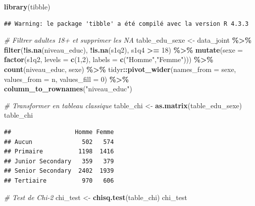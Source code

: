 \documentclass[
]{article}
\newenvironment{Shaded}{\begin{snugshade}}{\end{snugshade}}
\newcommand{\AttributeTok}[1]{\textcolor[rgb]{0.13,0.29,0.53}{#1}}
\newcommand{\CommentTok}[1]{\textcolor[rgb]{0.56,0.35,0.01}{\textit{#1}}}
\newcommand{\DecValTok}[1]{\textcolor[rgb]{0.00,0.00,0.81}{#1}}
\newcommand{\FunctionTok}[1]{\textcolor[rgb]{0.13,0.29,0.53}{\textbf{#1}}}
\newcommand{\NormalTok}[1]{#1}
\newcommand{\OtherTok}[1]{\textcolor[rgb]{0.56,0.35,0.01}{#1}}
\newcommand{\SpecialCharTok}[1]{\textcolor[rgb]{0.81,0.36,0.00}{\textbf{#1}}}
\newcommand{\StringTok}[1]{\textcolor[rgb]{0.31,0.60,0.02}{#1}}
\begin{document}
\begin{Shaded}
\begin{Highlighting}[]
\FunctionTok{library}\NormalTok{(tibble)}
\end{Highlighting}
\end{Shaded}

\begin{verbatim}
## Warning: le package 'tibble' a été compilé avec la version R 4.3.3
\end{verbatim}

\begin{Shaded}
\begin{Highlighting}[]
\CommentTok{\# Filtrer adultes 18+ et supprimer les NA}
\NormalTok{table\_edu\_sexe }\OtherTok{\textless{}{-}}\NormalTok{ data\_joint }\SpecialCharTok{\%\textgreater{}\%}
  \FunctionTok{filter}\NormalTok{(}\SpecialCharTok{!}\FunctionTok{is.na}\NormalTok{(niveau\_educ), }\SpecialCharTok{!}\FunctionTok{is.na}\NormalTok{(s1q2), s1q4 }\SpecialCharTok{\textgreater{}=} \DecValTok{18}\NormalTok{) }\SpecialCharTok{\%\textgreater{}\%}
  \FunctionTok{mutate}\NormalTok{(}\AttributeTok{sexe =} \FunctionTok{factor}\NormalTok{(s1q2, }\AttributeTok{levels =} \FunctionTok{c}\NormalTok{(}\DecValTok{1}\NormalTok{,}\DecValTok{2}\NormalTok{), }\AttributeTok{labels =} \FunctionTok{c}\NormalTok{(}\StringTok{"Homme"}\NormalTok{,}\StringTok{"Femme"}\NormalTok{))) }\SpecialCharTok{\%\textgreater{}\%}
  \FunctionTok{count}\NormalTok{(niveau\_educ, sexe) }\SpecialCharTok{\%\textgreater{}\%}
\NormalTok{  tidyr}\SpecialCharTok{::}\FunctionTok{pivot\_wider}\NormalTok{(}\AttributeTok{names\_from =}\NormalTok{ sexe, }\AttributeTok{values\_from =}\NormalTok{ n, }\AttributeTok{values\_fill =} \DecValTok{0}\NormalTok{) }\SpecialCharTok{\%\textgreater{}\%}
  \FunctionTok{column\_to\_rownames}\NormalTok{(}\StringTok{"niveau\_educ"}\NormalTok{)}

\CommentTok{\# Transformer en tableau classique}
\NormalTok{table\_chi }\OtherTok{\textless{}{-}} \FunctionTok{as.matrix}\NormalTok{(table\_edu\_sexe)}
\NormalTok{table\_chi}
\end{Highlighting}
\end{Shaded}

\begin{verbatim}
##                  Homme Femme
## Aucun              502   574
## Primaire          1198  1416
## Junior Secondary   359   379
## Senior Secondary  2402  1939
## Tertiaire          970   606
\end{verbatim}

\begin{Shaded}
\begin{Highlighting}[]
\CommentTok{\# Test de Chi{-}2}
\NormalTok{chi\_test }\OtherTok{\textless{}{-}} \FunctionTok{chisq.test}\NormalTok{(table\_chi)}
\NormalTok{chi\_test}
\end{Highlighting}
\end{Shaded}
\end{document}
